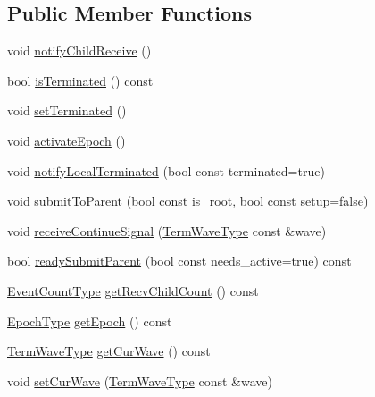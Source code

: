 \subsection*{Public Member Functions}
\begin{DoxyCompactItemize}
\item 
void \hyperlink{structvt_1_1term_1_1_term_state_a15191c2002809d73cd7f6d4c1a22b480}{notify\+Child\+Receive} ()
\item 
bool \hyperlink{structvt_1_1term_1_1_term_state_a3effc7cc47eb94edac12091aea044b02}{is\+Terminated} () const
\item 
void \hyperlink{structvt_1_1term_1_1_term_state_abcf1c80b28edf803367d9c047fd52bf7}{set\+Terminated} ()
\item 
void \hyperlink{structvt_1_1term_1_1_term_state_af18ed55a5c5b685b655e84aabd4d3d9c}{activate\+Epoch} ()
\item 
void \hyperlink{structvt_1_1term_1_1_term_state_a6b18d41b5a88a20e5231c236c996cfff}{notify\+Local\+Terminated} (bool const terminated=true)
\item 
void \hyperlink{structvt_1_1term_1_1_term_state_a3419f0c92e9b3d1ba7665f46c88f5526}{submit\+To\+Parent} (bool const is\+\_\+root, bool const setup=false)
\item 
void \hyperlink{structvt_1_1term_1_1_term_state_a9bf44783fc04e0e27056dfdc5eb0bc5a}{receive\+Continue\+Signal} (\hyperlink{namespacevt_1_1term_a4af17606966b2b5a6cba523bc39095a3}{Term\+Wave\+Type} const \&wave)
\item 
bool \hyperlink{structvt_1_1term_1_1_term_state_ac894c13192b87b7bbb467b4ddaa8a182}{ready\+Submit\+Parent} (bool const needs\+\_\+active=true) const
\item 
\hyperlink{structvt_1_1term_1_1_term_state_a900fe4e9d98c81a320ae1dca27b71c2c}{Event\+Count\+Type} \hyperlink{structvt_1_1term_1_1_term_state_a9d9eb29f1af45d4287b9535f33f14363}{get\+Recv\+Child\+Count} () const
\item 
\hyperlink{namespacevt_a81d11b28122d43bf9834577e4a06440f}{Epoch\+Type} \hyperlink{structvt_1_1term_1_1_term_state_a081ea661cb484ab14804dcd027a2d136}{get\+Epoch} () const
\item 
\hyperlink{namespacevt_1_1term_a4af17606966b2b5a6cba523bc39095a3}{Term\+Wave\+Type} \hyperlink{structvt_1_1term_1_1_term_state_a240b60d4d683179af84ab72e5d2092e9}{get\+Cur\+Wave} () const
\item 
void \hyperlink{structvt_1_1term_1_1_term_state_ac2ec8452c3f502107c79a17d8c9c75b7}{set\+Cur\+Wave} (\hyperlink{namespacevt_1_1term_a4af17606966b2b5a6cba523bc39095a3}{Term\+Wave\+Type} const \&wave)

\end{DoxyCompactItemize}
